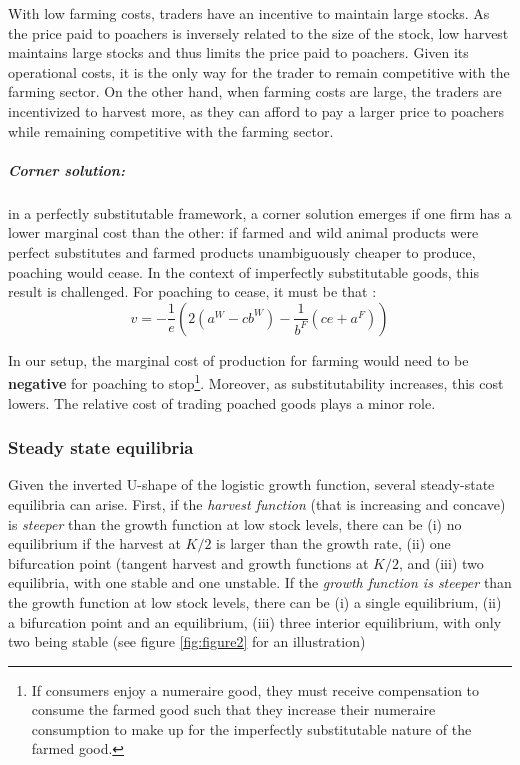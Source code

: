 With low farming costs, traders have an incentive to maintain large stocks. 
As the price paid to poachers is inversely related to the size of the stock, low harvest maintains large stocks and thus limits the price paid to poachers. Given its operational costs, it is the only way for the trader to remain competitive with the farming sector. 
On the other hand, when farming costs are large, the traders are incentivized to harvest more, as they can afford to pay a larger price to poachers while remaining competitive with the farming sector. 
\\
%
\subparagraph{Corner solution:} in a perfectly substitutable framework, a corner solution emerges if one firm has a lower marginal cost than the other: if farmed and wild animal products were perfect substitutes and farmed products unambiguously cheaper to produce, poaching would cease. In the context of imperfectly substitutable goods, this result is challenged. For poaching to cease, it must be that : 
\begin{equation}
v = -\frac{1}{e}(2(a^W - cb^W) - \frac{1}{b^F}(ce + a^F))
\end{equation}

In our setup, the marginal cost of production for farming would need to be \textbf{negative} for poaching to stop\footnote{If consumers enjoy a numeraire good, they must receive compensation to consume the farmed good such that they increase their numeraire consumption to make up for the imperfectly substitutable nature of the farmed good. }. Moreover, as substitutability increases, this cost lowers. The relative cost of trading poached goods plays a minor role.  


\subsubsection{Steady state equilibria}
\label{section:steadystates}
Given the inverted U-shape of the logistic growth function, several steady-state equilibria can arise. 
First, if the \textit{harvest function} (that is increasing and concave) is \textit{steeper} than the growth function at low stock levels, there can be (i) no equilibrium if the harvest at $K/2$ is larger than the growth rate, (ii) one bifurcation point (tangent harvest and growth functions at $K/2$, and (iii) two equilibria, with one stable and one unstable. If the \textit{growth function is steeper} than the growth function at low stock levels, there can be (i) a single equilibrium, (ii) a bifurcation point and an equilibrium, (iii) three interior equilibrium, with only two being stable (see figure \ref{fig:figure2} for an illustration)



